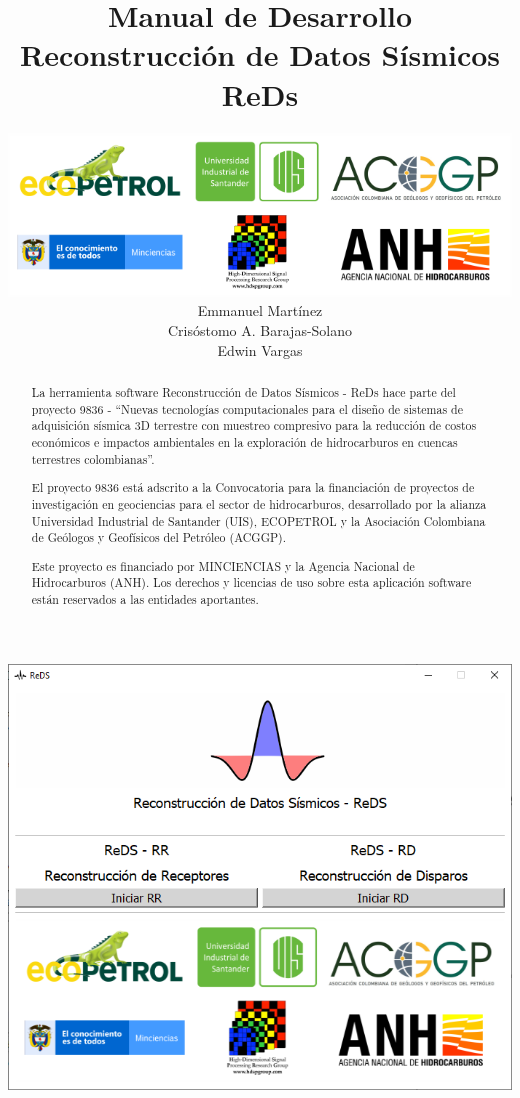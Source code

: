 \documentclass[12pt,twoside,letter]{ol-softwaremanual}
\title{\large{Manual de Desarrollo}\\ \vspace{10mm} \huge{Reconstrucción de Datos Sísmicos}\\ \vspace{5mm} \huge{ReDs}}
\author{\includegraphics[width=14cm]{figures/all_logos3.png} \\ Emmanuel Martínez \\ Crisóstomo A. Barajas-Solano \\ Edwin Vargas}
\begin{document}
\maketitle

\newpage\null\thispagestyle{empty}\newpage

\begin{center}
\includegraphics[width=.65\linewidth]{launch.png}
\end{center}
\begin{abstract}
La herramienta software Reconstrucción de Datos Sísmicos - ReDs hace parte del proyecto 9836 - ``Nuevas tecnologías computacionales para el diseño de sistemas de adquisición sísmica 3D terrestre con muestreo compresivo para la reducción de costos económicos e impactos ambientales en la exploración de hidrocarburos en cuencas terrestres colombianas''.

El proyecto 9836 está adscrito a la Convocatoria para la financiación de proyectos de investigación en geociencias para el sector de hidrocarburos, desarrollado por la alianza Universidad Industrial de Santander (UIS), ECOPETROL y la Asociación Colombiana de Geólogos y Geofísicos del Petróleo (ACGGP). 

Este proyecto es financiado por MINCIENCIAS y la Agencia Nacional de Hidrocarburos (ANH). Los derechos y licencias de uso sobre esta aplicación software están reservados a las entidades aportantes.
\end{abstract}
\end{document}
